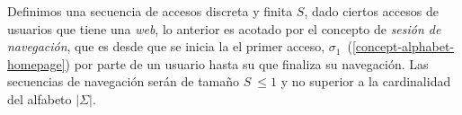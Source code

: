 
Definimos una secuencia de accesos discreta y finita  $S$, dado ciertos accesos de usuarios que tiene una \emph{web}, lo anterior es acotado por el concepto de \emph{sesión de navegación}, que es desde que se inicia la el primer acceso, $\sigma_{1}$~(\ref{concept-alphabet-homepage}) por parte de un usuario hasta su que finaliza su navegación. Las secuencias de navegación serán de tamaño $S\ \leq 1$ y  no superior a la cardinalidad del alfabeto $|\Sigma|$.